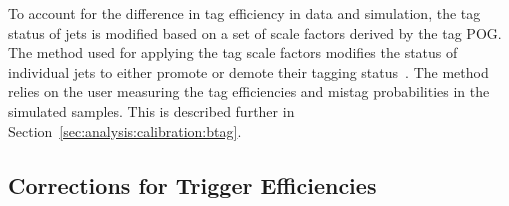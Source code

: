 To account for the difference in \PQb tag efficiency in data and simulation, the \PQb tag status of jets is modified based on a set of scale factors derived by the \PQb tag POG.  The method used for applying the \PQb tag scale factors modifies the status of individual jets to either promote or demote their \PQb tagging status~\cite{twiki:btag_method}.  The method relies on the user measuring the \PQb tag efficiencies and mistag probabilities in the simulated samples.  This is described further in Section~\ref{sec:analysis:calibration:btag}.








\subsection{Corrections for Trigger Efficiencies}
\label{sec:analysis:calibration:trigger}


